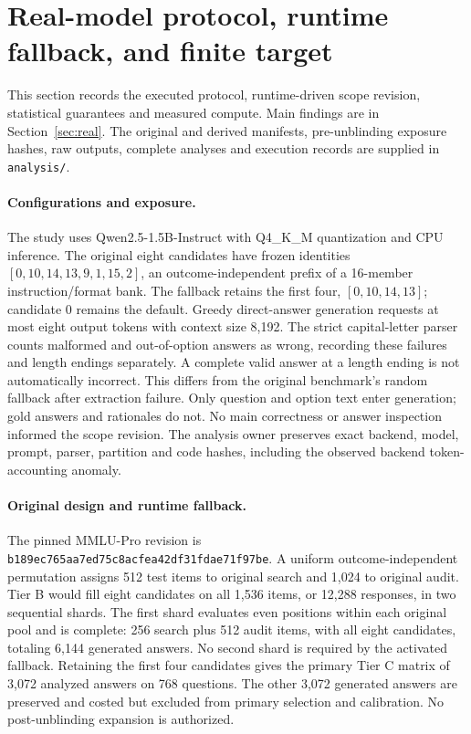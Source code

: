 \section{Real-model protocol, runtime fallback, and finite target}
\label{app:real-protocol}
This section records the executed protocol, runtime-driven scope revision, statistical guarantees and measured compute. Main findings are in Section~\ref{sec:real}. The original and derived manifests, pre-unblinding exposure hashes, raw outputs, complete analyses and execution records are supplied in \texttt{analysis/}.

\paragraph{Configurations and exposure.}
The study uses Qwen2.5-1.5B-Instruct with Q4\_K\_M quantization and CPU inference. The original eight candidates have frozen identities $[0,10,14,13,9,1,15,2]$, an outcome-independent prefix of a 16-member instruction/format bank. The fallback retains the first four, $[0,10,14,13]$; candidate 0 remains the default. Greedy direct-answer generation requests at most eight output tokens with context size 8,192. The strict capital-letter parser counts malformed and out-of-option answers as wrong, recording these failures and length endings separately. A complete valid answer at a length ending is not automatically incorrect. This differs from the original benchmark's random fallback after extraction failure. Only question and option text enter generation; gold answers and rationales do not. No main correctness or answer inspection informed the scope revision. The analysis owner preserves exact backend, model, prompt, parser, partition and code hashes, including the observed backend token-accounting anomaly.

\paragraph{Original design and runtime fallback.}
The pinned MMLU-Pro revision is \texttt{b189ec765aa7ed75c8acfea42df31fdae71f97be}. A uniform outcome-independent permutation assigns 512 test items to original search and 1,024 to original audit. Tier B would fill eight candidates on all 1,536 items, or 12,288 responses, in two sequential shards. The first shard evaluates even positions within each original pool and is complete: 256 search plus 512 audit items, with all eight candidates, totaling 6,144 generated answers. No second shard is required by the activated fallback. Retaining the first four candidates gives the primary Tier C matrix of 3,072 analyzed answers on 768 questions. The other 3,072 generated answers are preserved and costed but excluded from primary selection and calibration. No post-unblinding expansion is authorized.

